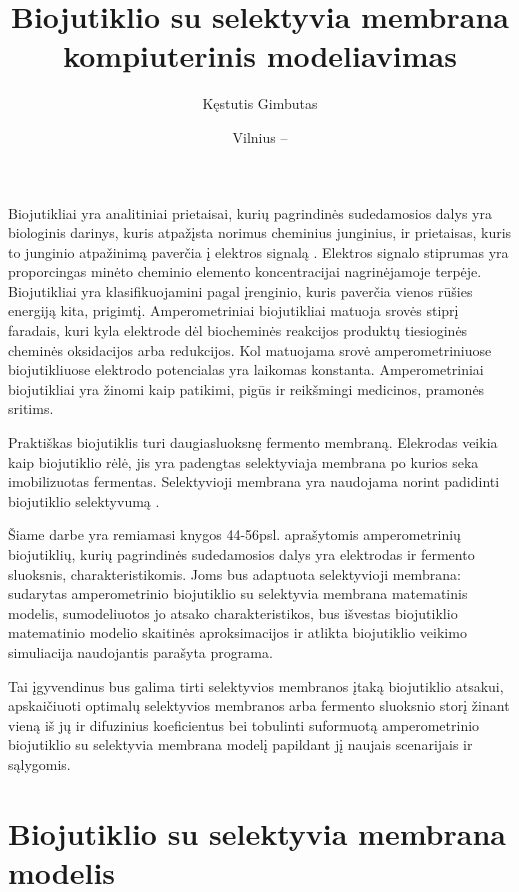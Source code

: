 \documentclass[12pt, a4paper, lithuanian]{article}
\title{Biojutiklio su selektyvia membrana kompiuterinis modeliavimas}
\author{
   Kęstutis Gimbutas
}
\date{Vilnius – \the\year}
\begin{document}
\sloppy
\maketitle

\tableofcontents

Biojutikliai yra analitiniai prietaisai, kurių pagrindinės sudedamosios dalys
yra biologinis darinys, kuris atpažįsta norimus cheminius junginius, ir
prietaisas, kuris to junginio atpažinimą  paverčia į elektros signalą \cite{baronas2009mathematical}. Elektros
signalo stiprumas yra proporcingas minėto cheminio elemento koncentracijai
nagrinėjamoje terpėje. Biojutikliai yra klasifikuojamini pagal įrenginio, kuris
paverčia vienos rūšies energiją kita,
prigimtį. Amperometriniai biojutikliai matuoja srovės stiprį faradais, kuri
kyla elektrode dėl biocheminės reakcijos produktų tiesioginės cheminės oksidacijos 
arba redukcijos. Kol matuojama srovė amperometriniuose biojutikliuose elektrodo potencialas yra
laikomas konstanta. Amperometriniai biojutikliai yra žinomi
kaip patikimi, pigūs ir reikšmingi medicinos, pramonės sritims.

Praktiškas biojutiklis turi daugiasluoksnę fermento membraną. Elekrodas veikia
kaip biojutiklio rėlė, jis yra padengtas selektyviaja membrana po kurios seka
imobilizuotas fermentas. Selektyvioji membrana yra naudojama norint padidinti
biojutiklio selektyvumą \cite{baronas2006computational}.

Šiame darbe yra remiamasi \cite{baronas2009mathematical} knygos 44-56psl.
aprašytomis amperometrinių biojutiklių, kurių pagrindinės sudedamosios dalys
yra elektrodas ir fermento sluoksnis, charakteristikomis. Joms bus adaptuota
selektyvioji membrana: sudarytas amperometrinio biojutiklio su selektyvia
membrana matematinis modelis, sumodeliuotos jo atsako charakteristikos, bus
išvestas biojutiklio matematinio modelio skaitinės aproksimacijos ir atlikta
biojutiklio veikimo simuliacija naudojantis parašyta programa.

Tai įgyvendinus bus galima tirti selektyvios membranos įtaką biojutiklio
atsakui, apskaičiuoti optimalų selektyvios membranos arba fermento sluoksnio
storį žinant vieną iš jų ir difuzinius koeficientus bei tobulinti suformuotą
amperometrinio biojutiklio su selektyvia membrana modelį papildant jį naujais
scenarijais ir sąlygomis.

\section{Biojutiklio su selektyvia membrana modelis}
\end{document}
